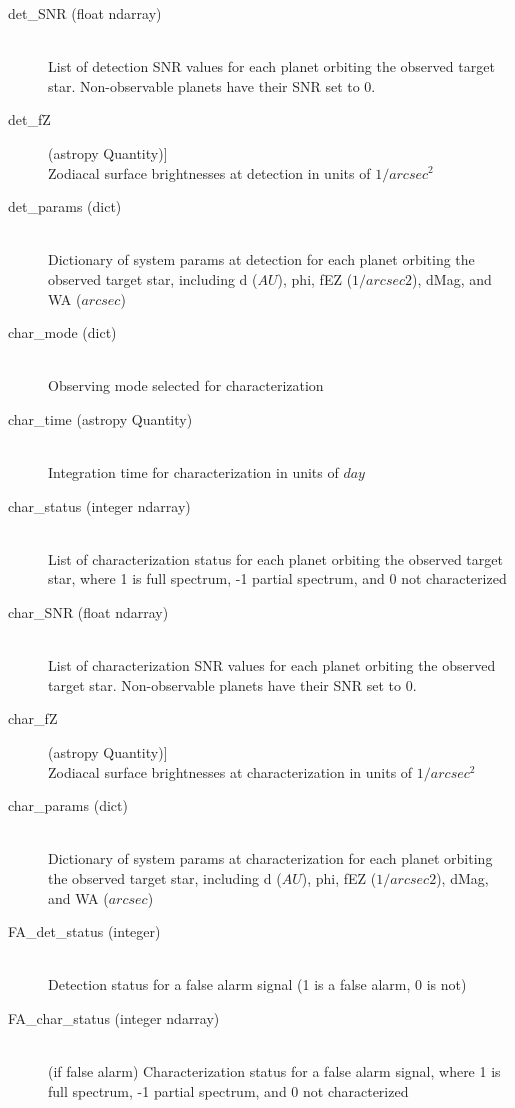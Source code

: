 \documentclass[cleanfoot]{asme2ej}
\begin{document}
\begin{itemize}
\begin{description}
\begin{description}
        \item[det\_SNR (float ndarray)] \hfill \\ List of detection SNR values for each planet orbiting the observed target star. Non-observable planets have their SNR set to 0.
        \item[det\_fZ] (astropy Quantity)] \hfill \\ Zodiacal surface brightnesses at detection in units of $1/arcsec^2$
        \item[det\_params (dict)] \hfill \\ Dictionary of system params at detection for each planet orbiting the observed target star, including d ($AU$), phi, fEZ ($1/arcsec2$), dMag, and WA ($arcsec$)
        \item[char\_mode (dict)] \hfill \\ Observing mode selected for characterization
        \item[char\_time (astropy Quantity)] \hfill \\ Integration time for characterization in units of $ day $
        \item[char\_status (integer ndarray)] \hfill \\ List of characterization status for each planet orbiting the observed target star, where 1 is full spectrum, -1 partial spectrum, and 0 not characterized
        \item[char\_SNR (float ndarray)] \hfill \\ List of characterization SNR values for each planet orbiting the observed target star. Non-observable planets have their SNR set to 0.
        \item[char\_fZ] (astropy Quantity)] \hfill \\ Zodiacal surface brightnesses at characterization in units of $1/arcsec^2$
        \item[char\_params (dict)] \hfill \\ Dictionary of system params at characterization for each planet orbiting the observed target star, including d ($AU$), phi, fEZ ($1/arcsec2$), dMag, and WA ($arcsec$)
        \item[FA\_det\_status (integer)] \hfill \\ Detection status for a false alarm signal (1 is a false alarm, 0 is not)
        \item[FA\_char\_status (integer ndarray)] \hfill \\ (if false alarm) Characterization status for a false alarm signal, where 1 is full spectrum, -1 partial spectrum, and 0 not characterized

\end{description}
\end{description}
\end{itemize}
\end{document}
